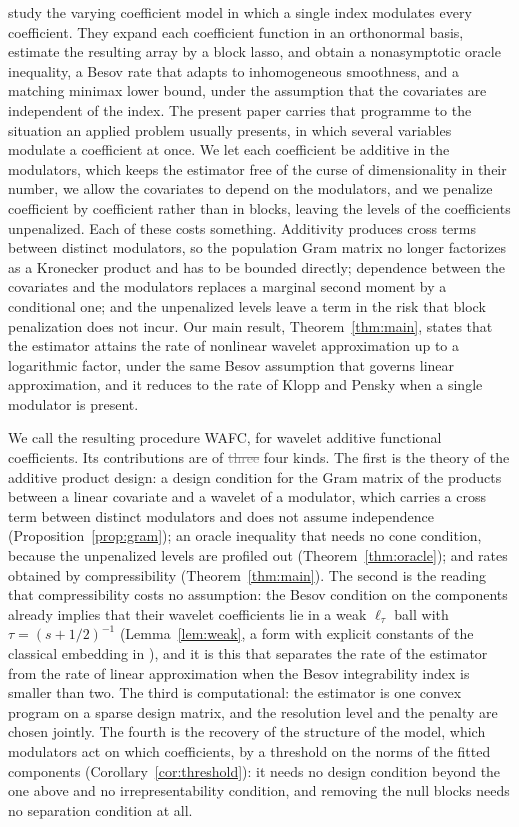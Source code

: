 \documentclass[12pt]{article} %
\theoremstyle{definition}
\begin{document}
\citet{Klopp-Pensky-2015} study the varying coefficient model in which a
single index modulates every coefficient. They expand each coefficient
function in an orthonormal basis, estimate the resulting array by a block
lasso, and obtain a nonasymptotic oracle inequality, a Besov rate that adapts
to inhomogeneous smoothness, and a matching minimax lower bound, under the
assumption that the covariates are independent of the index. The present paper
carries that programme to the situation an applied problem usually presents,
in which several variables modulate a coefficient at once. We let each
coefficient be additive in the modulators, which keeps the estimator free of
the curse of dimensionality in their number, we allow the covariates to depend
on the modulators, and we penalize coefficient by coefficient rather than in
blocks, leaving the levels of the coefficients unpenalized. Each of these
costs something. Additivity produces cross terms between distinct modulators,
so the population Gram matrix no longer factorizes as a Kronecker product and
has to be bounded directly; dependence between the covariates and the
modulators replaces a marginal second moment by a conditional one; and the
unpenalized levels leave a term in the risk that block penalization does not
incur. Our main result, Theorem~\ref{thm:main}, states that the estimator
attains the rate of nonlinear wavelet approximation up to a logarithmic
factor, under the same Besov assumption that governs \textcolor{colR1}{linear approximation}, and it
reduces to the rate of Klopp and Pensky when a single modulator is present.

We call the resulting procedure WAFC, for wavelet additive functional
coefficients. Its contributions are of \textcolor{gray}{\sout{three}} \textcolor{colR1}{four} kinds. The first is the theory of
the additive product design: a design condition for the Gram matrix of the
products between a linear covariate and a wavelet of a modulator, which
carries a cross term between distinct modulators and does not assume
independence (Proposition~\ref{prop:gram}); an oracle inequality that needs no
cone condition, because the unpenalized levels are profiled out
(Theorem~\ref{thm:oracle}); and rates obtained by compressibility
(Theorem~\ref{thm:main}). The second is the reading that compressibility costs
no assumption: the Besov condition on the components already implies that
their wavelet coefficients lie in a weak $\ell_\tau$ ball with
$\tau = (s+1/2)^{-1}$ (Lemma~\ref{lem:weak}\textcolor{colR1}{, a form with explicit constants of the classical embedding in \citealp[Proposition~9.15]{johnstone2019gaussian}}), and it is this that separates
the rate of the estimator from the rate of \textcolor{colR1}{linear approximation} when the Besov
integrability index is smaller than two. The third is computational: the
estimator is one convex program on a sparse design matrix, and the resolution
level and the penalty are chosen jointly. \textcolor{colR1}{The fourth is the
recovery of the structure of the model, which modulators act on which
coefficients, by a threshold on the norms of the fitted components
(Corollary~\ref{cor:threshold}): it needs no design condition beyond the one
above and no irrepresentability condition, and removing the null blocks needs
no separation condition at all.}
\end{document}
